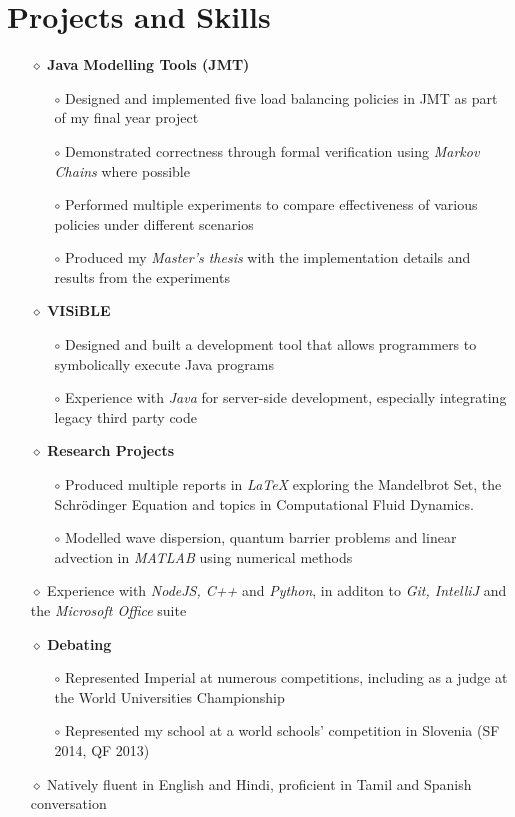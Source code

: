 \documentclass[a4paper]{article}
\begin{document}
\section*{Projects and Skills}
\vspace{-7pt}

\begin{itemize}
\item[$\diamond$] \textbf{Java Modelling Tools (JMT)}
\begin{itemize}
\item[$\circ$] Designed and implemented five load balancing policies in JMT as part of my final year project
\item[$\circ$] Demonstrated correctness through formal verification using \textit{Markov Chains} where possible
\item[$\circ$] Performed multiple experiments to compare effectiveness of various policies under different scenarios
\item[$\circ$] Produced my \textit{Master's thesis} with the implementation details and results from the experiments
\end{itemize}

\item[$\diamond$] \textbf{VISiBLE}
\begin{itemize}
\item[$\circ$] Designed and built a development tool that allows programmers to symbolically execute Java programs
\item[$\circ$] Experience with \textit{Java} for server-side development, especially integrating legacy third party code
\end{itemize}

\item[$\diamond$] \textbf{Research Projects}
\begin{itemize}
\item[$\circ$] Produced multiple reports in \textit{\LaTeX} exploring the Mandelbrot Set, the Schr\"odinger Equation and topics in Computational Fluid Dynamics.
\item[$\circ$] Modelled wave dispersion, quantum barrier problems and linear advection in \textit{MATLAB} using numerical methods
\end{itemize}

\item[$\diamond$] Experience with \textit{NodeJS, C++} and \textit{Python}, in additon to \textit{Git, IntelliJ} and the \textit{Microsoft Office} suite

\item[$\diamond$] \textbf{Debating}
\begin{itemize}
\item[$\circ$] Represented Imperial at numerous competitions, including as a judge at the World Universities Championship
\item[$\circ$] Represented my school at a world schools' competition in Slovenia (SF 2014, QF 2013)
\end{itemize}

\item[$\diamond$] Natively fluent in English and Hindi, proficient in Tamil and Spanish conversation

\end{itemize}
\end{document}
